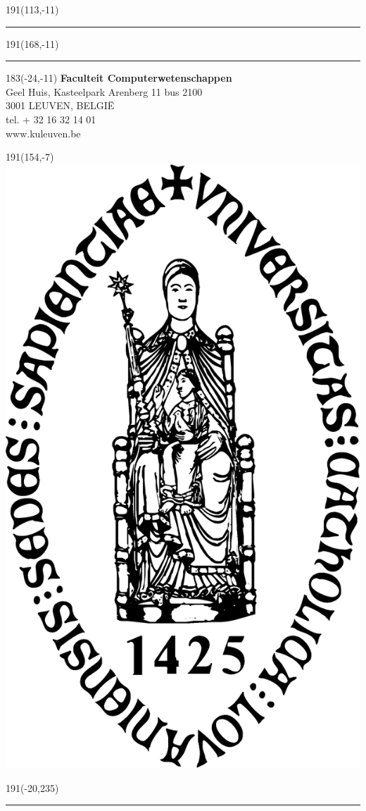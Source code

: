 \documentclass[12pt,a4paper,oneside]{book}
\begin{document}
\newpage
\thispagestyle{empty}
\sffamily
%
\begin{textblock}{191}(113,-11)
{\color{blueline}\rule{160pt}{5.5pt}}
\end{textblock}
%
\begin{textblock}{191}(168,-11)
{\color{blueline}\rule{5.5pt}{59pt}}
\end{textblock}
%
\begin{textblock}{183}(-24,-11)
\textblockcolour{}
\flushright
\fontsize{7}{7.5}\selectfont
\textbf{Faculteit Computerwetenschappen}\\
Geel Huis, Kasteelpark Arenberg 11 bus 2100\\
3001 LEUVEN, BELGI\"{E}\\
tel. + 32 16 32 14 01\\
www.kuleuven.be\\
\end{textblock}
%
\begin{textblock}{191}(154,-7)
\textblockcolour{}
\includegraphics*[height=16.5truemm]{sedes}
\end{textblock}
%
\begin{textblock}{191}(-20,235)
{\color{bluetitle}\rule{544pt}{55pt}}
\end{textblock}
\end{document}
